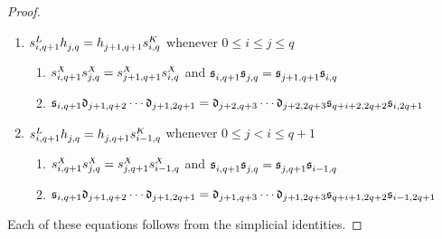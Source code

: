 \documentclass[10pt]{article}
\newcommand{\trip}[3]{{#1}_{\smash{#2}}^{\smash{#3}}}
\begin{document}
\begin{iteratedBarConstructions}
\begin{proof}
{\begin{enumerate}
\begin{enumerate}\squishlist
\setlength{\parindent}{.25in}
\item $\trip{d}{i,q+1}{X}\circ \trip{s}{j,q}{X}=\trip{s}{j,q-1}{X}\circ \trip{d}{i-1,q}{X}$ and $\trip{\frakd}{i,q+1}{}\circ \trip{\fraks}{j,q}{}=\trip{\fraks}{j,q-1}{}\circ \trip{\frakd}{i-1,q}{}$
\item 
$\frakd_{i,q+1}\circ
\frakd_{j+1,q+2}\circ\cdots \circ\frakd_{j+1,2q+1}=
\frakd_{j+1,q+1}\circ\cdots \circ\frakd_{j+1,2q-1}\circ
\frakd_{q+i-1,2q}\circ\frakd_{i-1,2q+1}$
\end{enumerate}
\item $\trip{s}{i,q+1}{L}\circ \trip{h}{j,q}{}=\trip{h}{j+1,q+1}{}\circ \trip{s}{i,q}{K}$ whenever $0\leq i\leq j\leq q$
\begin{enumerate}\squishlist
\setlength{\parindent}{.25in}
\item $\trip{s}{i,q+1}{X}\circ \trip{s}{j,q}{X}=\trip{s}{j+1,q+1}{X}\circ \trip{s}{i,q}{X}$ and $\trip{\fraks}{i,q+1}{}\circ \trip{\fraks}{j,q}{}=\trip{\fraks}{j+1,q+1}{}\circ \trip{\fraks}{i,q}{}$
\item 
$\mathfrak{s}_{i,q+1}\relax
\mathfrak{d}_{j+1,q+2}\relax\cdots \relax\mathfrak{d}_{j+1,2q+1}=
\mathfrak{d}_{j+2,q+3}\relax\cdots \relax\mathfrak{d}_{j+2,2q+3}\relax
\mathfrak{s}_{q+i+2,2q+2}\relax\mathfrak{s}_{i,2q+1}$
\end{enumerate}
\item $\trip{s}{i,q+1}{L}\circ \trip{h}{j,q}{}=\trip{h}{j,q+1}{}\circ \trip{s}{i-1,q}{K}$ whenever $0\leq j<i\leq q+1$
\begin{enumerate}\squishlist
\setlength{\parindent}{.25in}
\item $\trip{s}{i,q+1}{X}\circ \trip{s}{j,q}{X}=\trip{s}{j,q+1}{X}\circ \trip{s}{i-1,q}{X}$ and $\trip{\fraks}{i,q+1}{}\circ \trip{\fraks}{j,q}{}=\trip{\fraks}{j,q+1}{}\circ \trip{\fraks}{i-1,q}{}$
\item 
$\mathfrak{s}_{i,q+1}\relax
\mathfrak{d}_{j+1,q+2}\relax\cdots \relax\mathfrak{d}_{j+1,2q+1}=
\mathfrak{d}_{j+1,q+3}\relax\cdots \relax\mathfrak{d}_{j+1,2q+3}\relax
\mathfrak{s}_{q+i+1,2q+2}\relax\mathfrak{s}_{i-1,2q+1}$
\end{enumerate}
\end{enumerate}
}
\noindent Each of these equations follows from the simplicial identities.
\end{proof}
\end{iteratedBarConstructions}
%
%
\end{document}
